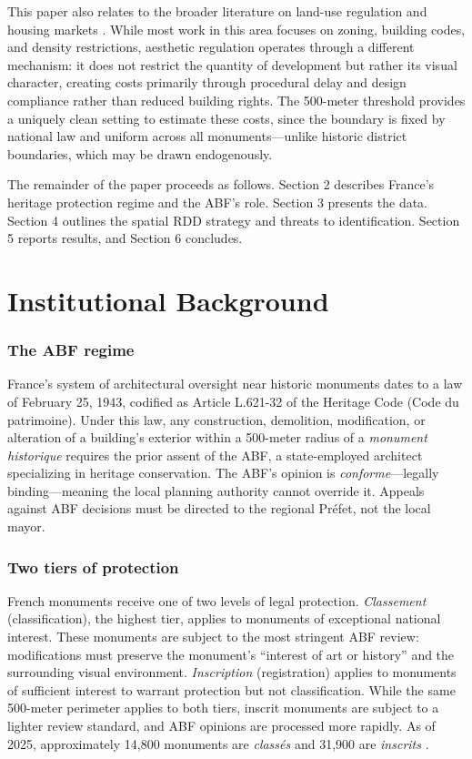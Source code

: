 \documentclass[12pt]{article}
\begin{document}
This paper also relates to the broader literature on land-use regulation and housing markets \citep{GlaserGyourko2003, Turner2014, Ganong2017}. While most work in this area focuses on zoning, building codes, and density restrictions, aesthetic regulation operates through a different mechanism: it does not restrict the quantity of development but rather its visual character, creating costs primarily through procedural delay and design compliance rather than reduced building rights. The 500-meter threshold provides a uniquely clean setting to estimate these costs, since the boundary is fixed by national law and uniform across all monuments---unlike historic district boundaries, which may be drawn endogenously.

The remainder of the paper proceeds as follows. Section 2 describes France's heritage protection regime and the ABF's role. Section 3 presents the data. Section 4 outlines the spatial RDD strategy and threats to identification. Section 5 reports results, and Section 6 concludes.

\section{Institutional Background}

\subsubsection*{The ABF regime} France's system of architectural oversight near historic monuments dates to a law of February 25, 1943, codified as Article L.621-32 of the Heritage Code (Code du patrimoine). Under this law, any construction, demolition, modification, or alteration of a building's exterior within a 500-meter radius of a \textit{monument historique} requires the prior assent of the ABF, a state-employed architect specializing in heritage conservation. The ABF's opinion is \textit{conforme}---legally binding---meaning the local planning authority cannot override it. Appeals against ABF decisions must be directed to the regional Pr\'{e}fet, not the local mayor.

\subsubsection*{Two tiers of protection} French monuments receive one of two levels of legal protection. \textit{Classement} (classification), the highest tier, applies to monuments of exceptional national interest. These monuments are subject to the most stringent ABF review: modifications must preserve the monument's ``interest of art or history'' and the surrounding visual environment. \textit{Inscription} (registration) applies to monuments of sufficient interest to warrant protection but not classification. While the same 500-meter perimeter applies to both tiers, inscrit monuments are subject to a lighter review standard, and ABF opinions are processed more rapidly. As of 2025, approximately 14,800 monuments are \textit{class\'{e}s} and 31,900 are \textit{inscrits} \citep{MinCulture2025}.
\end{document}
